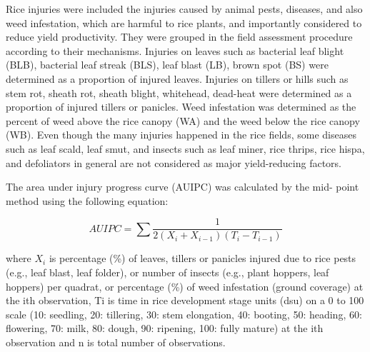 Rice injuries were included the injuries caused by animal pests, diseases, and also weed infestation, which are harmful to rice plants, and importantly considered to reduce yield productivity. They were grouped in the field assessment procedure according to their mechanisms. Injuries on leaves such as bacterial leaf blight (BLB), bacterial leaf streak (BLS), leaf blast (LB), brown spot (BS) were determined as a proportion of injured leaves. Injuries on tillers or hills such as stem rot, sheath rot, sheath blight, whitehead, dead-heat were determined as a proportion of injured tillers or panicles. Weed infestation was determined as the percent of weed above the rice canopy (WA) and the weed below the rice canopy (WB). Even though the many injuries happened in the rice fields, some diseases such as leaf scald, leaf smut, and insects such as leaf miner, rice thrips, rice hispa, and defoliators in general are not considered as major yield-reducing factors.

The area under injury progress curve (AUIPC) was calculated by the mid- point method using the following equation:

\begin{equation}
AUIPC = \sum{\frac{1}{2(X_{i} + X_{i-1})(T_{i} - T_{i-1})}}
\end{equation}

where $X_i$ is percentage (\%) of leaves, tillers or panicles injured due to rice pests (e.g., leaf blast, leaf folder), or number of insects (e.g., plant hoppers, leaf hoppers) per quadrat, or percentage (\%) of weed infestation (ground coverage) at the ith observation, Ti is time in rice development stage units (dsu) on a 0 to 100 scale (10: seedling, 20: tillering, 30: stem elongation, 40: booting, 50: heading, 60: flowering, 70: milk, 80: dough, 90: ripening, 100: fully mature) at the ith observation and n is total number of observations.